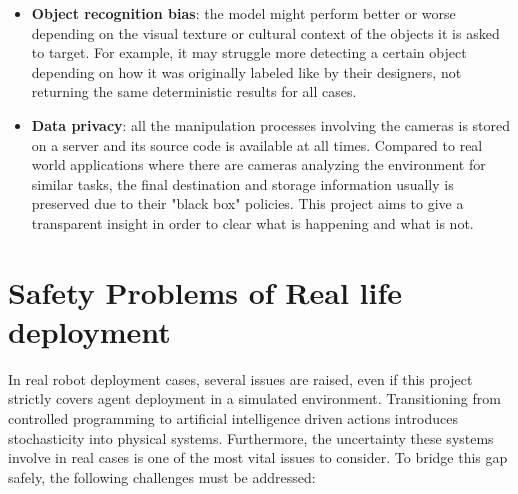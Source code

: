 \begin{itemize}
	\item \textbf{Object recognition bias}: the model might perform better or worse depending on the visual texture or cultural context of the objects it is asked to target. For example, it may struggle more detecting a certain object depending on how it was originally labeled like by their designers, not returning the same deterministic results for all cases. 
	
	\item \textbf{Data privacy}: all the manipulation processes involving the cameras is stored on a server and its source code is available at all times. Compared to real world applications where there are cameras analyzing the environment for similar tasks, the final destination and storage information usually is preserved due to their "black box" policies. This project aims to give a transparent insight in order to clear what is happening and what is not.  
\end{itemize}

\section{Safety Problems of Real life deployment}
In real robot deployment cases, several issues are raised, even if this project strictly covers agent deployment in a simulated environment. Transitioning from controlled programming to artificial intelligence driven actions introduces stochasticity into physical systems. Furthermore, the uncertainty these systems involve in real cases is one of the most vital issues to consider. To bridge this gap safely, the following challenges must be addressed:

